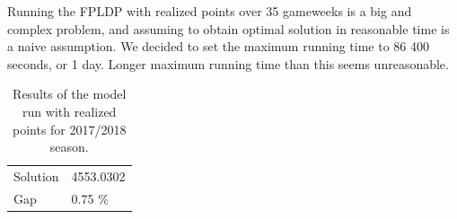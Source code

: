 Running the FPLDP with realized points over 35 gameweeks is a big and complex problem, and assuming to obtain optimal solution in reasonable time is a naive assumption. We decided to set the maximum running time to 86 400 seconds, or 1 day. Longer maximum running time than this seems unreasonable. 

\newpar


\begin{table}[H]
\centering
\begin{tabular}{@{}ll@{}}
\toprule
         &           \\ 
\midrule
Solution & 4553.0302 \\
Gap      & 0.75 \%   \\ 
\bottomrule
\end{tabular}
\caption{Results of the model run with realized points for 2017/2018 season.}
\label{tab:results_realized_points}
\end{table}


\begin{table}[H]
\centering
{}
\caption{Model run with different number of gameweeks.}
\label{tab:realized_points_diff_gameweeks}
\end{table}

